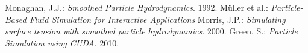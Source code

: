 \documentclass[a4paper,report]{IEEEtran}
\begin{document}


%
%
%
\begin{thebibliography}{1}


	Monaghan, J.J.: \emph{Smoothed Particle Hydrodynamics}. 1992.
	Müller et al.: \emph{Particle-Based Fluid Simulation for Interactive Applications}
	Morris, J.P.: \emph{Simulating surface tension with smoothed particle hydrodynamics}. 2000.
	Green, S.: \emph{Particle Simulation using CUDA}. 2010.

\end{thebibliography}




\end{document}
